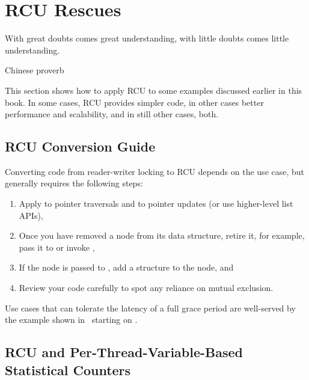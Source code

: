 
\section{RCU Rescues}
\label{sec:together:RCU Rescues}
%
\epigraph{With great doubts comes great understanding, with little doubts
	  comes little understanding.}
	 {Chinese proverb}

This section shows how to apply RCU to some examples discussed earlier
in this book.
In some cases, RCU provides simpler code, in other cases better
performance and scalability, and in still other cases, both.

\subsection{RCU Conversion Guide}
\label{sec:together:RCU Conversion Guide}

Converting code from reader-writer locking to RCU depends on the use
case, but generally requires the following steps:

\begin{enumerate}
\item	Apply  to pointer traversals and
	 to pointer updates (or use higher-level
	list APIs),
\item	Once you have removed a node from its data structure,
	retire it, for example, pass it to  or invoke
	,
\item	If the node is passed to , add a 
	structure to the node, and
\item	Review your code carefully to spot any reliance on mutual
	exclusion.
\end{enumerate}

Use cases that can tolerate the latency of a full grace period are
well-served by the example shown
in~
starting on
.


\subsection{RCU and Per-Thread-Variable-Based Statistical Counters}
\label{sec:together:RCU and Per-Thread-Variable-Based Statistical Counters}

